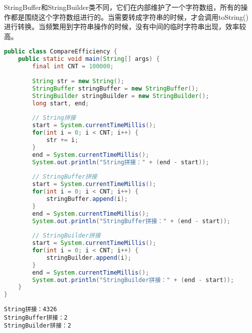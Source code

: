 StringBuffer和StringBuilder类不同，它们在内部维护了一个字符数组，所有的操作都是围绕这个字符数组进行的。当需要转成字符串的时候，才会调用toString()进行转换。当频繁用到字符串操作的时候，没有中间的临时字符串出现，效率较高。 \\


\begin{lstlisting}[language=Java]
public class CompareEfficiency {
    public static void main(String[] args) {
        final int CNT = 100000;
        
        String str = new String();
        StringBuffer stringBuffer = new StringBuffer();
        StringBuilder stringBuilder = new StringBuilder();
        long start, end;
        
        // String拼接
        start = System.currentTimeMillis();
        for(int i = 0; i < CNT; i++) {
            str += i;
        }
        end = System.currentTimeMillis();
        System.out.println("String拼接：" + (end - start));
        
        // StringBuffer拼接
        start = System.currentTimeMillis();
        for(int i = 0; i < CNT; i++) {
            stringBuffer.append(i);
        }
        end = System.currentTimeMillis();
        System.out.println("StringBuffer拼接：" + (end - start));
        
        // StringBuilder拼接
        start = System.currentTimeMillis();
        for(int i = 0; i < CNT; i++) {
            stringBuilder.append(i);
        }
        end = System.currentTimeMillis();
        System.out.println("StringBuilder拼接：" + (end - start));
    }
}
\end{lstlisting}

\begin{tcolorbox}
	\begin{verbatim}
String拼接：4326
StringBuffer拼接：2
StringBuilder拼接：2
	\end{verbatim}
\end{tcolorbox}

\newpage